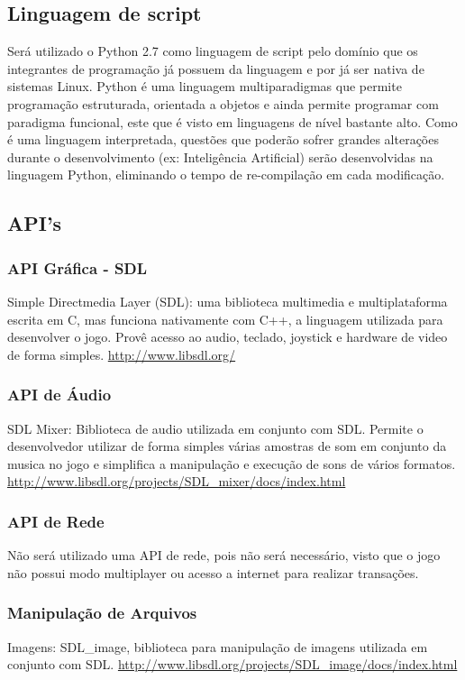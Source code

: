\documentclass[12pt,a4paper]{article}
\begin{document}
\subsection{Linguagem de script}
	Será utilizado o Python 2.7 como linguagem de script pelo domínio que os integrantes de
programação já possuem da linguagem e por já ser nativa de sistemas Linux. Python é uma linguagem
multiparadigmas que permite programação estruturada, orientada a objetos e ainda permite programar
com paradigma funcional, este que é visto em linguagens de nível bastante alto. Como é uma linguagem
interpretada, questões que poderão sofrer grandes alterações durante o desenvolvimento (ex:
Inteligência Artificial) serão desenvolvidas na linguagem Python, eliminando o tempo de re-compilação
em cada modificação.

\subsection{API's}
\subsubsection{API Gráfica - SDL}
	Simple Directmedia Layer (SDL): uma biblioteca multimedia e multiplataforma escrita em C, mas funciona nativamente com C++, a linguagem utilizada para desenvolver o jogo.
	Provê acesso ao audio, teclado, joystick e hardware de video de forma simples. \url{http://www.libsdl.org/}

\subsubsection{API de Áudio}
	SDL Mixer:	Biblioteca de audio utilizada em conjunto com SDL. Permite o desenvolvedor utilizar de forma simples várias amostras de som em conjunto da musica no jogo e simplifica a manipulação e execução de sons de vários formatos. \url{http://www.libsdl.org/projects/SDL_mixer/docs/index.html}

\subsubsection{API de Rede}
	Não será utilizado uma API de rede, pois não será necessário, visto que o jogo não possui modo multiplayer ou acesso a internet para realizar transações.
	
\subsubsection{Manipulação de Arquivos}
	Imagens: SDL_image, biblioteca para manipulação de imagens utilizada em conjunto com SDL. \url{http://www.libsdl.org/projects/SDL_image/docs/index.html}
	
\end{document}
